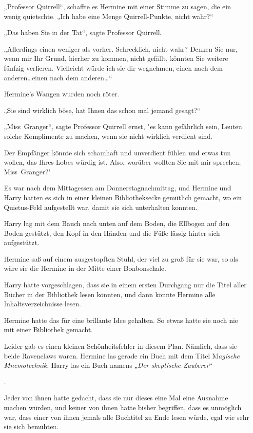 {„Professor Quirrell“, schaffte es Hermine mit einer Stimme zu sagen, die ein wenig quietschte. „Ich habe eine Menge Quirrell-Punkte, nicht wahr?“

„Das haben Sie in der Tat“, sagte Professor Quirrell.

„Allerdings einen weniger als vorher. Schrecklich, nicht wahr? Denken Sie nur, wenn mir Ihr Grund, hierher zu kommen, nicht gefällt, könnten Sie weitere fünfzig verlieren. Vielleicht würde ich sie dir wegnehmen, einen nach dem anderen…einen nach dem anderen…“

Hermine's Wangen wurden noch röter.

„Sie sind wirklich böse, hat Ihnen das schon mal jemand gesagt?“

„Miss~Granger“, sagte Professor Quirrell ernst, "es kann gefährlich sein, Leuten solche Komplimente zu machen, wenn sie nicht wirklich verdient sind.

Der Empfänger könnte sich schamhaft und unverdient fühlen und etwas tun wollen, das Ihres Lobes würdig ist. Also, worüber wollten Sie mit mir sprechen, Miss~Granger?"

Es war nach dem Mittagessen am Donnerstagnachmittag, und Hermine und Harry hatten es sich in einer kleinen Bibliotheksecke gemütlich gemacht, wo ein Quietus-Feld aufgestellt war, damit sie sich unterhalten konnten.

Harry lag mit dem Bauch nach unten auf dem Boden, die Ellbogen auf den Boden gestützt, den Kopf in den Händen und die Füße lässig hinter sich aufgestützt.

Hermine saß auf einem ausgestopften Stuhl, der viel zu groß für sie war, so als wäre sie die Hermine in der Mitte einer Bonbonschale.

Harry hatte vorgeschlagen, dass sie in einem ersten Durchgang nur die Titel aller Bücher in der Bibliothek lesen könnten, und dann könnte Hermine alle Inhaltsverzeichnisse lesen.

Hermine hatte das für eine brillante Idee gehalten. So etwas hatte sie noch nie mit einer Bibliothek gemacht.

Leider gab es einen kleinen Schönheitsfehler in diesem Plan. Nämlich, dass sie beide Ravenclaws waren. Hermine las gerade ein Buch mit dem Titel M\emph{agische Mnemotechnik.} Harry las ein Buch namens „\emph{Der skeptische Zauberer}“

.

Jeder von ihnen hatte gedacht, dass sie nur dieses eine Mal eine Ausnahme machen würden, und keiner von ihnen hatte bisher begriffen, dass es unmöglich war, dass einer von ihnen jemals alle Buchtitel zu Ende lesen würde, egal wie sehr sie sich bemühten.

}
